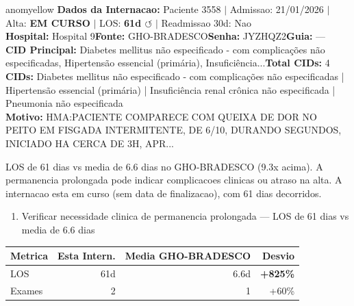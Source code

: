\documentclass[a4paper,10pt]{article}
\begin{document}
\begin{anomalycard}[Internacao 113696 | GHO-BRADESCO | MODERADO (z=2.21)]{anomyellow}
\textbf{Dados da Internacao:} Paciente 3558 $\mid$ Admissao: 21/01/2026 $\mid$ Alta: \textcolor{anomorange}{\textbf{EM CURSO}} $\mid$ LOS: \textbf{61d \textcolor{anomorange}{$\circlearrowleft$}} $\mid$ Readmissao 30d: Nao\\
\textbf{Hospital:} Hospital 9\quad\textbf{Fonte:} GHO-BRADESCO\quad\textbf{Senha:} JYZHQZ2\quad\textbf{Guia:} ---\\
\textbf{CID Principal:} {\small Diabetes mellitus não especificado - com complicações não especificadas, Hipertensão essencial (primária), Insuficiência...}\quad\textbf{Total CIDs:} 4\\

\textbf{CIDs:} {\scriptsize Diabetes mellitus não especificado - com complicações não especificadas | Hipertensão essencial (primária) | Insuficiência renal crônica não especificada | Pneumonia não especificada}\\

\textbf{Motivo:} {\scriptsize HMA:PACIENTE COMPARECE COM QUEIXA DE DOR NO PEITO EM FISGADA INTERMITENTE, DE 6/10, DURANDO SEGUNDOS, INICIADO HA CERCA DE 3H, APR...}\\

\vspace{2pt}\begin{tcolorbox}[colback=severityred!20,colframe=anomyellow,title={\textbf{Interpretacao de Negocio}},fonttitle=\bfseries\small,left=4pt,right=4pt,top=3pt,bottom=3pt]
{\small LOS de 61 dias vs media de 6.6 dias no GHO-BRADESCO (9.3x acima). A permanencia prolongada pode indicar complicacoes clinicas ou atraso na alta. A internacao esta em curso (sem data de finalizacao), com 61 dias decorridos.}
\end{tcolorbox}
\begin{tcolorbox}[colback=severityyellow!30,colframe=anomorange,title={\textbf{Recomendacoes Especificas}},fonttitle=\bfseries\small,left=4pt,right=4pt,top=3pt,bottom=3pt]
\begin{enumerate}[nosep,leftmargin=16pt]
\item {\small Verificar necessidade clinica de permanencia prolongada --- LOS de 61 dias vs media de 6.6 dias}
\end{enumerate}
\end{tcolorbox}
\begin{center}\begin{tabular}{l r r r}\toprule\textbf{Metrica} & \textbf{Esta Intern.} & \textbf{Media GHO-BRADESCO} & \textbf{Desvio} \\\midrule
LOS & 61d & 6.6d & \textcolor{anomred}{\textbf{+825\%}} \\
Exames & 2 & 1 & \textcolor{anomorange}{+60\%} \\
\bottomrule\end{tabular}\end{center}


\end{anomalycard}
\end{document}

